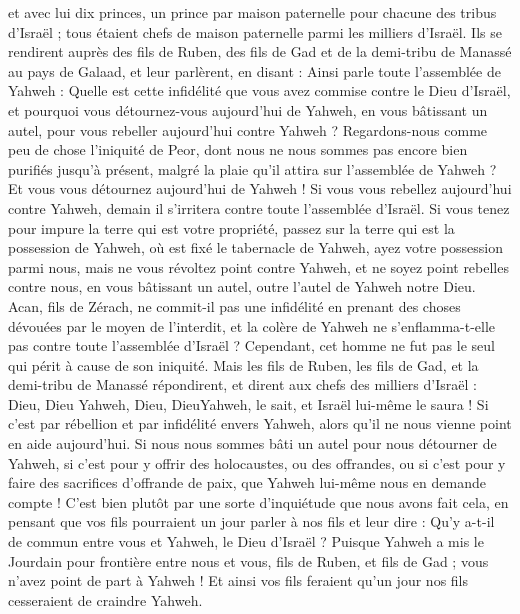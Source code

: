 \begin{multicols}{2}
et avec lui dix princes, un prince par maison paternelle pour chacune des tribus d'Israël ; tous étaient chefs de maison paternelle parmi les milliers d'Israël.
Ils se rendirent auprès des fils de Ruben, des fils de Gad et de la demi-tribu de Manassé au pays de Galaad, et leur parlèrent, en disant :
Ainsi parle toute l'assemblée de Yahweh : Quelle est cette infidélité que vous avez commise contre le Dieu d'Israël, et pourquoi vous détournez-vous aujourd'hui de Yahweh, en vous bâtissant un autel, pour vous rebeller aujourd'hui contre Yahweh ?
Regardons-nous comme peu de chose l'iniquité de Peor, dont nous ne nous sommes pas encore bien purifiés jusqu'à présent, malgré la plaie qu'il attira sur l'assemblée de Yahweh ?
Et vous vous détournez aujourd'hui de Yahweh ! Si vous vous rebellez aujourd'hui contre Yahweh, demain il s'irritera contre toute l'assemblée d'Israël.
Si vous tenez pour impure la terre qui est votre propriété, passez sur la terre qui est la possession de Yahweh, où est fixé le tabernacle de Yahweh, ayez votre possession parmi nous, mais ne vous révoltez point contre Yahweh, et ne soyez point rebelles contre nous, en vous bâtissant un autel, outre l'autel de Yahweh notre Dieu.
Acan, fils de Zérach, ne commit-il pas une infidélité en prenant des choses dévouées par le moyen de l'interdit, et la colère de Yahweh ne s'enflamma-t-elle pas contre toute l'assemblée d'Israël ? Cependant, cet homme ne fut pas le seul qui périt à cause de son iniquité.
Mais les fils de Ruben, les fils de Gad, et la demi-tribu de Manassé répondirent, et dirent aux chefs des milliers d'Israël :
Dieu, Dieu Yahweh, Dieu, DieuYahweh, le sait, et Israël lui-même le saura ! Si c'est par rébellion et par infidélité envers Yahweh, alors qu'il ne nous vienne point en aide aujourd'hui.
Si nous nous sommes bâti un autel pour nous détourner de Yahweh, si c'est pour y offrir des holocaustes, ou des offrandes, ou si c'est pour y faire des sacrifices d'offrande de paix, que Yahweh lui-même nous en demande compte !
C'est bien plutôt par une sorte d'inquiétude que nous avons fait cela, en pensant que vos fils pourraient un jour parler à nos fils et leur dire : Qu'y a-t-il de commun entre vous et Yahweh, le Dieu d'Israël ?
Puisque Yahweh a mis le Jourdain pour frontière entre nous et vous, fils de Ruben, et fils de Gad ; vous n'avez point de part à Yahweh ! Et ainsi vos fils feraient qu'un jour nos fils cesseraient de craindre Yahweh.

\end{multicols}
